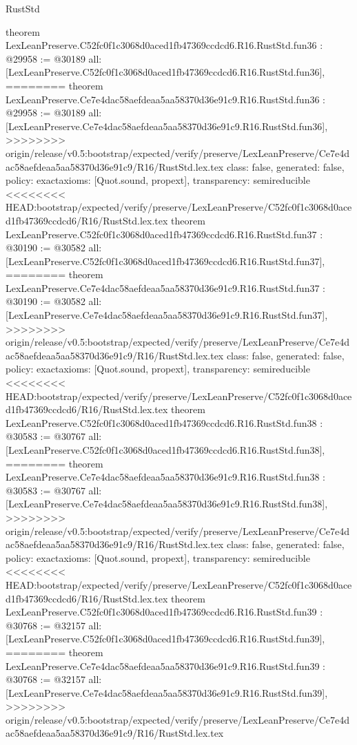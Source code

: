 \begin{lexlean}{RustStd}
\begin{coremodule}
{\begin{coremodule}
{{{{{{{{{{{{{{{{{{{{{{{{{{{{{{{{{{{{{{theorem LexLeanPreserve.C52fc0f1c3068d0aced1fb47369ccdcd6.R16.RustStd.fun36 : @29958 := @30189 {
  all: [LexLeanPreserve.C52fc0f1c3068d0aced1fb47369ccdcd6.R16.RustStd.fun36],
========
theorem LexLeanPreserve.Ce7e4dac58aefdeaa5aa58370d36e91c9.R16.RustStd.fun36 : @29958 := @30189 {
  all: [LexLeanPreserve.Ce7e4dac58aefdeaa5aa58370d36e91c9.R16.RustStd.fun36],
>>>>>>>> origin/release/v0.5:bootstrap/expected/verify/preserve/LexLeanPreserve/Ce7e4dac58aefdeaa5aa58370d36e91c9/R16/RustStd.lex.tex
  class: false,
  generated: false,
  policy: exact{axioms: [Quot.sound, propext]},
  transparency: semireducible
}
<<<<<<<< HEAD:bootstrap/expected/verify/preserve/LexLeanPreserve/C52fc0f1c3068d0aced1fb47369ccdcd6/R16/RustStd.lex.tex
theorem LexLeanPreserve.C52fc0f1c3068d0aced1fb47369ccdcd6.R16.RustStd.fun37 : @30190 := @30582 {
  all: [LexLeanPreserve.C52fc0f1c3068d0aced1fb47369ccdcd6.R16.RustStd.fun37],
========
theorem LexLeanPreserve.Ce7e4dac58aefdeaa5aa58370d36e91c9.R16.RustStd.fun37 : @30190 := @30582 {
  all: [LexLeanPreserve.Ce7e4dac58aefdeaa5aa58370d36e91c9.R16.RustStd.fun37],
>>>>>>>> origin/release/v0.5:bootstrap/expected/verify/preserve/LexLeanPreserve/Ce7e4dac58aefdeaa5aa58370d36e91c9/R16/RustStd.lex.tex
  class: false,
  generated: false,
  policy: exact{axioms: [Quot.sound, propext]},
  transparency: semireducible
}
<<<<<<<< HEAD:bootstrap/expected/verify/preserve/LexLeanPreserve/C52fc0f1c3068d0aced1fb47369ccdcd6/R16/RustStd.lex.tex
theorem LexLeanPreserve.C52fc0f1c3068d0aced1fb47369ccdcd6.R16.RustStd.fun38 : @30583 := @30767 {
  all: [LexLeanPreserve.C52fc0f1c3068d0aced1fb47369ccdcd6.R16.RustStd.fun38],
========
theorem LexLeanPreserve.Ce7e4dac58aefdeaa5aa58370d36e91c9.R16.RustStd.fun38 : @30583 := @30767 {
  all: [LexLeanPreserve.Ce7e4dac58aefdeaa5aa58370d36e91c9.R16.RustStd.fun38],
>>>>>>>> origin/release/v0.5:bootstrap/expected/verify/preserve/LexLeanPreserve/Ce7e4dac58aefdeaa5aa58370d36e91c9/R16/RustStd.lex.tex
  class: false,
  generated: false,
  policy: exact{axioms: [Quot.sound, propext]},
  transparency: semireducible
}
<<<<<<<< HEAD:bootstrap/expected/verify/preserve/LexLeanPreserve/C52fc0f1c3068d0aced1fb47369ccdcd6/R16/RustStd.lex.tex
theorem LexLeanPreserve.C52fc0f1c3068d0aced1fb47369ccdcd6.R16.RustStd.fun39 : @30768 := @32157 {
  all: [LexLeanPreserve.C52fc0f1c3068d0aced1fb47369ccdcd6.R16.RustStd.fun39],
========
theorem LexLeanPreserve.Ce7e4dac58aefdeaa5aa58370d36e91c9.R16.RustStd.fun39 : @30768 := @32157 {
  all: [LexLeanPreserve.Ce7e4dac58aefdeaa5aa58370d36e91c9.R16.RustStd.fun39],
>>>>>>>> origin/release/v0.5:bootstrap/expected/verify/preserve/LexLeanPreserve/Ce7e4dac58aefdeaa5aa58370d36e91c9/R16/RustStd.lex.tex
}}}}}}}}}}}}}}}}}}}}}}}}}}}}}}}}}}}}}}}}}}}
\end{coremodule}}
\end{coremodule}
\end{lexlean}
